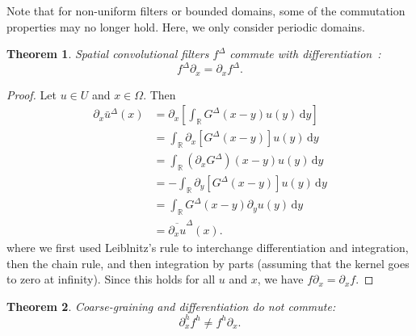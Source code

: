 \documentclass[preprint,twocolumn,5p]{elsarticle}
\newtheorem{theorem}{Theorem}
\begin{document}
Note that for non-uniform filters or bounded domains,
some of the commutation properties may no longer hold.
Here, we only consider periodic domains.

\begin{theorem} \label{th:commutation-f-partial}
    Spatial convolutional filters $f^\Delta$ commute with
    differentiation~\cite{berselliMathematicsLargeEddy2006}:
    \begin{equation}
        f^\Delta \partial_x = \partial_x f^\Delta.
    \end{equation}
\end{theorem}

\begin{proof}
    Let $u \in U$ and $x \in \Omega$. Then
    \begin{equation}
    \begin{split}
        \partial_x \bar{u}^\Delta(x)
        & = \partial_x \left[ \int_\mathbb{R} G^\Delta(x - y) u(y) \, \mathrm{d} y \right] \\
        & = \int_\mathbb{R} \partial_x [G^\Delta(x - y)] u(y) \, \mathrm{d} y \\
        & = \int_\mathbb{R} (\partial_x G^\Delta)(x - y) u(y) \, \mathrm{d} y \\
        & = -\int_\mathbb{R} \partial_y [G^\Delta(x - y)] u(y) \, \mathrm{d} y \\
        & = \int_\mathbb{R} G^\Delta(x - y) \partial_y u(y) \, \mathrm{d} y \\
        & = \overline{\partial_x u}^\Delta(x).
    \end{split}
    \end{equation}
    where we first used Leiblnitz's rule to interchange differentiation and
    integration, then the chain rule, and then integration by parts (assuming that
    the kernel goes to zero at infinity).
    Since this holds for all $u$ and $x$, we have $f \partial_x = \partial_x f$.
\end{proof}


\begin{theorem} \label{th:noncommutation-coarsegraining}
    Coarse-graining and differentiation do not commute:
    \begin{equation}
        \partial^h_x f^h \neq f^h \partial_x.
    \end{equation}
\end{theorem}
\end{document}
